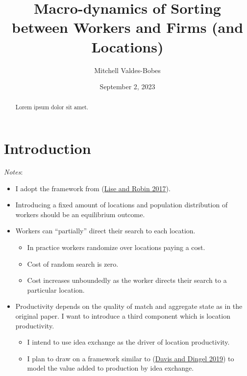 \documentclass[
  letterpaper,
  DIV=11,
  numbers=noendperiod]{scrreprt}
\title{Macro-dynamics of Sorting between Workers and Firms (and
Locations)}
\author{Mitchell Valdes-Bobes}
\date{September 2, 2023}
\providecommand{\tightlist}{%
  \setlength{\itemsep}{0pt}\setlength{\parskip}{0pt}}\usepackage{longtable,booktabs,array}
\renewcommand*\contentsname{Table of contents}
\newcommand\contentsname{Table of contents}
\begin{document}
\maketitle
\begin{abstract}
Lorem ipsum dolor sit amet.
\end{abstract}
\ifdefined\Shaded\renewenvironment{Shaded}{\begin{tcolorbox}[frame hidden, boxrule=0pt, breakable, enhanced, interior hidden, borderline west={3pt}{0pt}{shadecolor}, sharp corners]}{\end{tcolorbox}}\fi

\renewcommand*\contentsname{Table of contents}
{
\hypersetup{linkcolor=}
\setcounter{tocdepth}{2}
\tableofcontents
}

\hypertarget{introduction}{%
\chapter{Introduction}\label{introduction}}

\emph{Notes}:

\begin{itemize}
\tightlist
\item
  I adopt the framework from
  (\protect\hyperlink{ref-liseMacrodynamicsSortingWorkers2017}{Lise and
  Robin 2017}).
\item
  Introducing a fixed amount of locations and population distribution of
  workers should be an equilibrium outcome.
\item
  Workers can ``partially'' direct their search to each location.

  \begin{itemize}
  \tightlist
  \item
    In practice workers randomize over locations paying a cost.
  \item
    Cost of random search is zero.
  \item
    Cost increases unboundedly as the worker directs their search to a
    particular location.
  \end{itemize}
\item
  Productivity depends on the quality of match and aggregate state as in
  the original paper. I want to introduce a third component which is
  location productivity.

  \begin{itemize}
  \tightlist
  \item
    I intend to use idea exchange as the driver of location
    productivity.
  \item
    I plan to draw on a framework similar to
    (\protect\hyperlink{ref-davisSpatialKnowledgeEconomy2019}{Davis and
    Dingel 2019}) to model the value added to production by idea
    exchange.
  \end{itemize}
\end{itemize}
\end{document}
